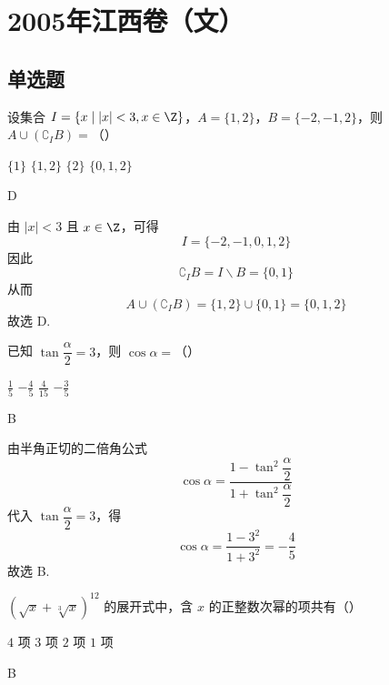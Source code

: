 \chapter{2005年江西卷（文）}
\section{单选题}
\begin{problem}
设集合 \(I = \{x \mid |x| < 3, x \in \Z\}\)，\(A = \{1, 2\}\)，\(B = \{-2, -1, 2\}\)，则 \(A \cup (\complement_{I} B) =\)（\quad）

\choices
    {\(\{1\}\)}
    {\(\{1, 2\}\)}
    {\(\{2\}\)}
    {\(\{0, 1, 2\}\)}
\end{problem}

\begin{answer}
D
\end{answer}

\begin{solution}
由 \(|x|<3\) 且 \(x\in\Z\)，可得
\[
I=\{-2,-1,0,1,2\}
\]
因此
\[
\complement_I B=I\smallsetminus B=\{0,1\}
\]
从而
\[
A\cup(\complement_I B)=\{1,2\}\cup\{0,1\}=\{0,1,2\}
\]
故选 D.
\end{solution}

\begin{problem}
已知 \(\tan\dfrac{\alpha}{2}=3\)，则 \(\cos\alpha=\)（\quad）

\choices
    {\(\frac{1}{5}\)}
    {\(-\frac{4}{5}\)}
    {\(\frac{4}{15}\)}
    {\(-\frac{3}{5}\)}
\end{problem}

\begin{answer}
B
\end{answer}

\begin{solution}
由半角正切的二倍角公式
\[
\cos\alpha=\frac{1-\tan^2\dfrac{\alpha}{2}}{1+\tan^2\dfrac{\alpha}{2}}
\]
代入 \(\tan\dfrac{\alpha}{2}=3\)，得
\[
\cos\alpha=\frac{1-3^2}{1+3^2}=-\frac45
\]
故选 B.
\end{solution}

\begin{problem}
\((\sqrt{x}+\sqrt[3]{x})^{12}\) 的展开式中，含 \(x\) 的正整数次幂的项共有（\quad）

\choices
    {\(4\) 项}
    {\(3\) 项}
    {\(2\) 项}
    {\(1\) 项}
\end{problem}

\begin{answer}
B
\end{answer}

